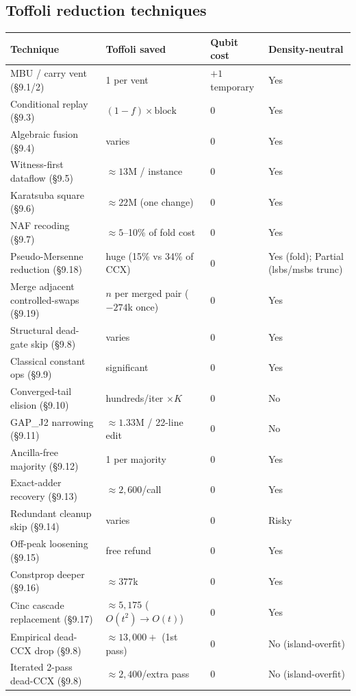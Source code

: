 \documentclass[11pt,a4paper]{article}
\begin{document}
\subsection{Toffoli reduction techniques}

\begin{center}
\small
\begin{tabular}{p{4.8cm}p{3cm}p{2.5cm}p{2.5cm}}
\toprule
\textbf{Technique} & \textbf{Toffoli saved} & \textbf{Qubit cost} & \textbf{Density-neutral} \\
\midrule
MBU / carry vent (\S9.1/2) & 1 per vent & $+1$ temporary & Yes \\
Conditional replay (\S9.3) & $(1-f)\times\text{block}$ & 0 & Yes \\
Algebraic fusion (\S9.4) & varies & 0 & Yes \\
Witness-first dataflow (\S9.5) & $\approx13$M / instance & 0 & Yes \\
Karatsuba square (\S9.6) & $\approx22$M (one change) & 0 & Yes \\
NAF recoding (\S9.7) & $\approx5$--10\% of fold cost & 0 & Yes \\
Pseudo-Mersenne reduction (\S9.18) & huge (15\% vs 34\% of CCX) & 0 & Yes (fold); Partial (lsbs/msbs trunc) \\
Merge adjacent controlled-swaps (\S9.19) & $n$ per merged pair ($-274$k once) & 0 & Yes \\
Structural dead-gate skip (\S9.8) & varies & 0 & Yes \\
Classical constant ops (\S9.9) & significant & 0 & Yes \\
Converged-tail elision (\S9.10) & hundreds/iter $\times K$ & 0 & No \\
GAP\_J2 narrowing (\S9.11) & $\approx1.33$M / 22-line edit & 0 & No \\
Ancilla-free majority (\S9.12) & 1 per majority & 0 & Yes \\
Exact-adder recovery (\S9.13) & $\approx2{,}600$/call & 0 & Yes \\
Redundant cleanup skip (\S9.14) & varies & 0 & Risky \\
Off-peak loosening (\S9.15) & free refund & 0 & Yes \\
Constprop deeper (\S9.16) & $\approx377$k & 0 & Yes \\
Cinc cascade replacement (\S9.17) & $\approx5{,}175$ ($O(t^2)\to O(t)$) & 0 & Yes \\
Empirical dead-CCX drop (\S9.8) & $\approx13{,}000+$ (1st pass) & 0 & No (island-overfit) \\
Iterated 2-pass dead-CCX (\S9.8) & $\approx2{,}400$/extra pass & 0 & No (island-overfit) \\
\bottomrule
\end{tabular}
\end{center}
\end{document}
